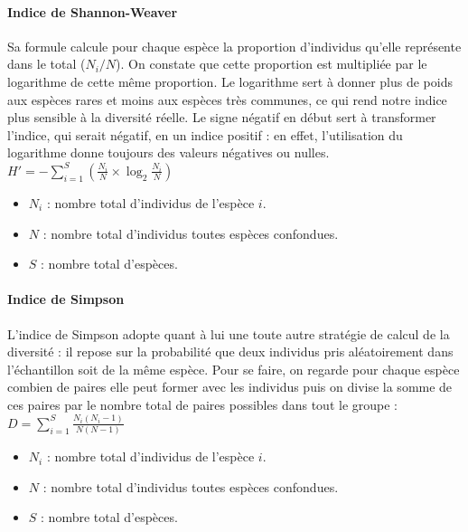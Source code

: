 \documentclass[a4paper,twoside,12pt]{book}
\begin{document}
\paragraph{Indice de Shannon-Weaver}

Sa formule calcule pour chaque espèce la proportion d’individus qu’elle représente dans le total (\(N_i / N\)). On constate que cette proportion est multipliée par le logarithme de cette même proportion. Le logarithme sert à donner plus de poids aux espèces rares et moins aux espèces très communes, ce qui rend notre indice plus sensible à la diversité réelle. Le signe négatif en début sert à transformer l’indice, qui serait négatif, en un indice positif : en effet, l’utilisation du logarithme donne toujours des valeurs négatives ou nulles. \\

$H' = - \sum_{i=1}^{S} \left( \frac{N_i}{N} \times \log_2 \frac{N_i}{N} \right)$\\

\begin{itemize}
	\item $N_i$ : nombre total d’individus de l’espèce $i$.
	\item $N$ : nombre total d’individus toutes espèces confondues.
	\item $S$ : nombre total d’espèces.
\end{itemize}

\paragraph{Indice de Simpson}

L'indice de Simpson adopte quant à lui une toute autre stratégie de calcul de la diversité :  il repose sur la probabilité que deux individus pris aléatoirement dans l'échantillon soit de la même espèce. Pour se faire, on regarde pour chaque espèce combien de paires elle peut former avec les individus puis on divise la somme de ces paires  par le nombre total de paires possibles dans tout le groupe : \\

$D = \sum_{i=1}^{S} \frac{N_i (N_i - 1)}{N (N - 1)}$ \\

\begin{itemize}
	\item $N_i$ : nombre total d’individus de l’espèce $i$.
	\item $N$ : nombre total d’individus toutes espèces confondues.
	\item $S$ : nombre total d’espèces.
\end{itemize}
\end{document}
